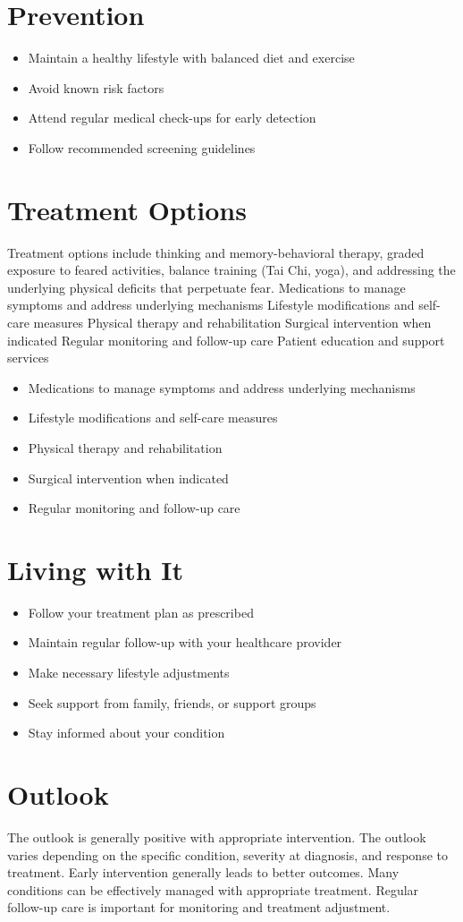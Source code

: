 \section{Prevention}
\begin{itemize}[noitemsep]
  \item Maintain a healthy lifestyle with balanced diet and exercise
  \item Avoid known risk factors
  \item Attend regular medical check-ups for early detection
  \item Follow recommended screening guidelines
\end{itemize}
\section{Treatment Options}
Treatment options include thinking and memory-behavioral therapy, graded exposure to feared activities, balance training (Tai Chi, yoga), and addressing the underlying physical deficits that perpetuate fear. Medications to manage symptoms and address underlying mechanisms Lifestyle modifications and self-care measures Physical therapy and rehabilitation Surgical intervention when indicated Regular monitoring and follow-up care Patient education and support services

\begin{itemize}[noitemsep]
  \item Medications to manage symptoms and address underlying mechanisms
  \item Lifestyle modifications and self-care measures
  \item Physical therapy and rehabilitation
  \item Surgical intervention when indicated
  \item Regular monitoring and follow-up care
\end{itemize}
\section{Living with It}
\begin{itemize}[noitemsep]
  \item Follow your treatment plan as prescribed
  \item Maintain regular follow-up with your healthcare provider
  \item Make necessary lifestyle adjustments
  \item Seek support from family, friends, or support groups
  \item Stay informed about your condition
\end{itemize}
\section{Outlook}
The outlook is generally positive with appropriate intervention. The outlook varies depending on the specific condition, severity at diagnosis, and response to treatment. Early intervention generally leads to better outcomes. Many conditions can be effectively managed with appropriate treatment. Regular follow-up care is important for monitoring and treatment adjustment.
